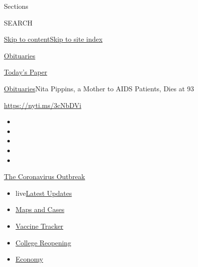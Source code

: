 Sections

SEARCH

\protect\hyperlink{site-content}{Skip to
content}\protect\hyperlink{site-index}{Skip to site index}

\href{https://www.nytimes3xbfgragh.onion/section/obituaries}{Obituaries}

\href{https://myaccount.nytimes3xbfgragh.onion/auth/login?response_type=cookie\&client_id=vi}{}

\href{https://www.nytimes3xbfgragh.onion/section/todayspaper}{Today's
Paper}

\href{/section/obituaries}{Obituaries}\textbar{}Nita Pippins, a Mother
to AIDS Patients, Dies at 93

\url{https://nyti.ms/3cNbDVi}

\begin{itemize}
\item
\item
\item
\item
\item
\end{itemize}

\href{https://www.nytimes3xbfgragh.onion/news-event/coronavirus?action=click\&pgtype=Article\&state=default\&region=TOP_BANNER\&context=storylines_menu}{The
Coronavirus Outbreak}

\begin{itemize}
\tightlist
\item
  live\href{https://www.nytimes3xbfgragh.onion/2020/08/04/world/coronavirus-covid-19.html?action=click\&pgtype=Article\&state=default\&region=TOP_BANNER\&context=storylines_menu}{Latest
  Updates}
\item
  \href{https://www.nytimes3xbfgragh.onion/interactive/2020/us/coronavirus-us-cases.html?action=click\&pgtype=Article\&state=default\&region=TOP_BANNER\&context=storylines_menu}{Maps
  and Cases}
\item
  \href{https://www.nytimes3xbfgragh.onion/interactive/2020/science/coronavirus-vaccine-tracker.html?action=click\&pgtype=Article\&state=default\&region=TOP_BANNER\&context=storylines_menu}{Vaccine
  Tracker}
\item
  \href{https://www.nytimes3xbfgragh.onion/2020/08/02/us/covid-college-reopening.html?action=click\&pgtype=Article\&state=default\&region=TOP_BANNER\&context=storylines_menu}{College
  Reopening}
\item
  \href{https://www.nytimes3xbfgragh.onion/live/2020/08/03/business/stock-market-today-coronavirus?action=click\&pgtype=Article\&state=default\&region=TOP_BANNER\&context=storylines_menu}{Economy}
\end{itemize}

